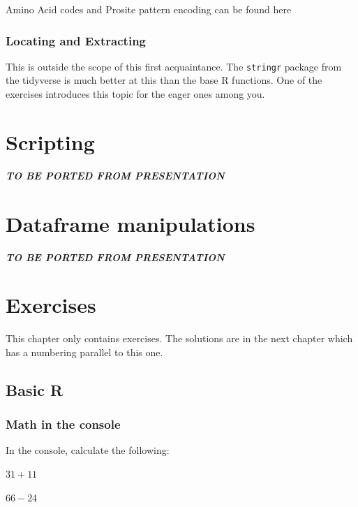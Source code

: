\documentclass[]{book}
\begin{document}
Amino Acid codes and Prosite pattern encoding can be found
here

\hypertarget{locating-and-extracting}{%
\subsection{Locating and Extracting}\label{locating-and-extracting}}

This is outside the scope of this first acquaintance. The \texttt{stringr} package from the tidyverse is much better at this than the base R functions. One of the exercises introduces this topic for the eager ones among you.

\hypertarget{scripting}{%
\chapter{Scripting}\label{scripting}}

\textbf{\emph{TO BE PORTED FROM PRESENTATION}}

\hypertarget{dataframe-manipulations-1}{%
\chapter{Dataframe manipulations}\label{dataframe-manipulations-1}}

\textbf{\emph{TO BE PORTED FROM PRESENTATION}}

\hypertarget{exercises}{%
\chapter{Exercises}\label{exercises}}

This chapter only contains exercises. The solutions are in the next chapter which has a numbering parallel to this one.

\hypertarget{basic-r}{%
\section{Basic R}\label{basic-r}}

\hypertarget{math-in-the-console}{%
\subsection{Math in the console}\label{math-in-the-console}}

In the console, calculate the following:

\(31 + 11\)

\(66 - 24\)
\end{document}
